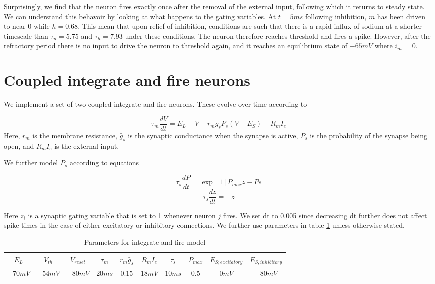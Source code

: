 \documentclass{article}
\begin{document}
Surprisingly, we find that the neuron fires exactly once after the removal of the external input, following which it returns to steady state. We can understand this behavoir by looking at what happens to the gating variables. At $t=5ms$ following inhibition, $m$ has been driven to near $0$ while $h=0.68$. This mean that upon relief of inhibition, conditions are such that there is a rapid influx of sodium at a shorter timescale than $\tau_n = 5.75$ and $\tau_h=7.93$ under these conditions. The neuron therefore reaches threshold and fires a spike. However, after the refractory period there is no input to drive the neuron to threshold again, and it reaches an equilibrium state of $-65 mV$ where $i_m$ = 0.

\section{Coupled integrate and fire neurons}

We implement a set of two coupled integrate and fire neurons. These evolve over time according to

\begin{equation}
\tau_m \dfrac{dV}{dt} = E_L - V - r_m \bar g_s P_s(V-E_S) + R_m I_e
\end{equation}
Here, $r_m$ is the membrane resistance, $\bar g_s$ is the synaptic conductance when the synapse is active, $P_s$ is the probability of the synapse being open, and $R_mI_e$ is the external input.

We further model $P_s$ according to equations

\begin{equation}
\tau_s \dfrac{dP}{dt} = \exp{[1]}P_{max}z-Ps
\end{equation}
\begin{equation}
\tau_s \dfrac{dz}{dt} = -z
\end{equation}

Here $z_i$ is a synaptic gating variable that is set to 1 whenever neuron $j$ fires. We set dt to 0.005 since decreasing dt further does not affect spike times in the case of either excitatory or inhibitory connections. We further use parameters in table \ref{tab:paramsif} unless otherwise stated.

\begin{table}[h]
\centering
\begin{tabular}{ |c|c|c|c|c|c|c|c|c|c|}
\hline
 $E_L$ &  $V_{th}$ & $V_{reset}$ & $\tau_m$ & $r_m \bar g_s$ & $R_m I_e$ & $\tau_s$ & $P_{max}$ & $E_{S; excitatory}$ & $E_{S, inhibitory}$\\
\hline
$-70 mV $ & $ -54 mV $ & $ -80 mV $ & $ 20 ms $ & $ 0.15 $ & $18 mV$ & $10 ms$ & $0.5$ & $0 mV$ & $-80 mV$\\
\hline
\end{tabular}
\caption{Parameters for integrate and fire model}
\label{tab:paramsif}
\end{table}
\end{document}
